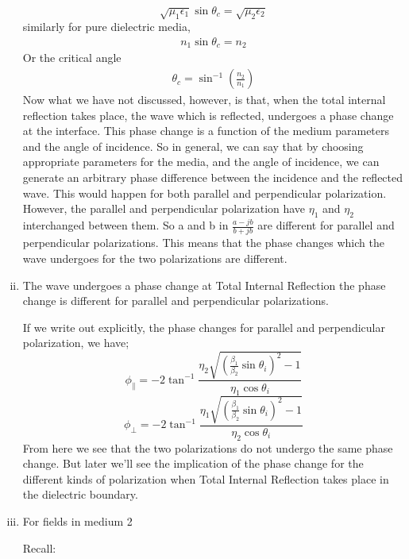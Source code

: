 \begin{enumerate}[(i)]
\begin{equation*}
\sqrt{\mu_1\epsilon_1} \sin\theta_c = \sqrt{\mu_2\epsilon_2}
\end{equation*}
similarly for pure dielectric media, 
\begin{align*}
n_1 \sin\theta_c = n_2
\end{align*}
Or the critical angle
\begin{align*}
\theta_c = \sin^{-1}(\frac{n_2}{n_1}) 
\end{align*}
Now what we have not discussed, however, is that, when the total internal reflection takes place, the wave which is reflected, undergoes a phase change at the interface. This phase change is a function of the medium parameters and the angle of incidence. So in general, we can say that by choosing appropriate parameters for the media, and the angle of incidence, we can generate an arbitrary phase difference between the incidence and the reflected wave. This would happen for both parallel and perpendicular polarization. However, the parallel and perpendicular polarization have $\eta_1$ and $\eta_2$
interchanged between them. So a and b in $\frac{a - j b}{b + j b}$ are different for parallel and perpendicular polarizations. This means that the phase changes which the wave undergoes for the two polarizations are different.

\item The wave undergoes a phase change at Total Internal Reflection the phase change is different for parallel and perpendicular polarizations.

If we write out explicitly, the phase changes for parallel and perpendicular polarization, we have;
\begin{equation}
\phi_\parallel = -2\tan^{-1}\frac{\eta_2\sqrt{(\frac{\beta_1}{\beta_2}\sin\theta_i)^2-1}}{\eta_1\cos\theta_i}
\end{equation}
\begin{equation}
\phi_\perp = -2\tan^{-1}\frac{\eta_1\sqrt{(\frac{\beta_1}{\beta_2}\sin\theta_i)^2-1}}{\eta_2\cos\theta_i}
\end{equation}
From here we see that the two polarizations do not undergo the same phase change. But later we'll see the implication of the phase change for the different kinds of polarization when Total Internal Reflection takes place in the dielectric boundary. 

\item For fields in medium 2

Recall:


\end{enumerate}
